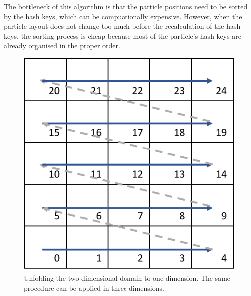 \documentclass[a4paper,12pt,openany]{book}
\theoremstyle{break}
\begin{document}
The bottleneck of this algorithm is that the particle positions need to be sorted by the hash keys, which can be compuationally expensive. However, when the particle layout does not change too much before the recalculation of the hash keys, the sorting process is cheap because most of the particle's hash keys are already organised in the proper order.\\
\begin{figure}[h!]
  \includegraphics[scale=0.6]{hash_key.pdf}
  \centering
  \caption{Unfolding the two-dimensional domain to one dimension. The same procedure can be applied in three dimensions.}
  \label{fig:unfolding}
\end{figure}\vspace*{3pt}
\end{document}
